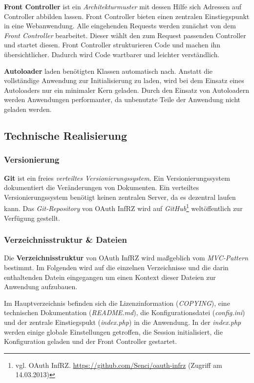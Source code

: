 \documentclass[12pt,a4paper,pointednumbers,abstracton]{scrartcl}
\begin{document}
\textbf{Front Controller} ist ein \emph{Architekturmuster} mit dessen Hilfe sich Adressen auf Controller abbilden lassen.
Front Controller bieten einen zentralen Einstiegspunkt in eine Webanwendung.
Alle eingehenden Requests werden zunächst von dem \emph{Front Controller} bearbeitet.
Dieser wählt den zum Request passenden Controller und startet diesen.
Front Controller strukturieren Code und machen ihn übersichtlicher.
Dadurch wird Code wartbarer und leichter verständlich.

\textbf{Autoloader} laden benötigten Klassen automatisch nach.
Anstatt die vollständige Anwendung zur Initialisierung zu laden, wird bei dem Einsatz eines Autoloaders nur ein minimaler Kern geladen.
Durch den Einsatz von Autoloadern werden Anwendungen performanter, da unbenutzte Teile der Anwendung nicht geladen werden.

\subsection{Technische Realisierung}

\subsubsection{Versionierung}

\textbf{Git} ist ein freies \emph{verteiltes Versionierungssystem}.
Ein Versionierungssystem dokumentiert die Veränderungen von Dokumenten.
Ein verteiltes Versionierungssystem benötigt keinen zentralen Server, da es dezentral laufen kann.
Das \emph{Git-Repository} von OAuth InfRZ wird auf \emph{GitHub}\footnote{vgl. OAuth InfRZ. \url{https://github.com/Senci/oauth-infrz} (Zugriff am 14.03.2013)} weltöffentlich zur Verfügung gestellt.

\subsubsection{Verzeichnisstruktur \& Dateien}

Die \textbf{Verzeichnisstruktur} von OAuth InfRZ wird maßgeblich vom \emph{MVC-Pattern} bestimmt.
Im Folgenden wird auf die einzelnen Verzeichnisse und die darin enthaltenden Datein eingegangen um einen Kontext dieser Dateien zur Anwendung aufzubauen.

Im Hauptverzeichnis befinden sich die Lizenzinformation (\emph{COPYING}), eine technischen Dokumentation (\emph{README.md}), die Konfigurationsdatei (\emph{config.ini}) und der zentrale Einstiegspukt (\emph{index.php}) in die Anwendung.
In der \emph{index.php} werden einige globale Einstellungen getroffen, die Session initialisiert, die Konfiguration geladen und der Front Controller gestartet.
\end{document}
